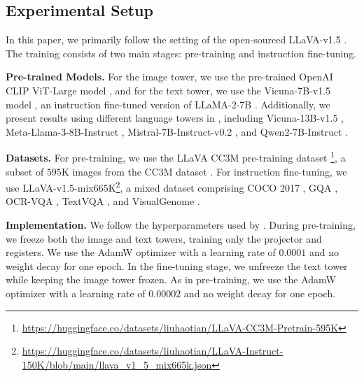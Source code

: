 \documentclass{article} %
\begin{document}
\subsection{Experimental Setup}
\label{subsec:setup}
In this paper, we primarily follow the setting of the open-sourced LLaVA-v1.5 \citep{liu2024improved}. The training consists of two main stages: pre-training and instruction fine-tuning.

\textbf{Pre-trained Models.} For the image tower, we use the pre-trained OpenAI CLIP ViT-Large model \citep{radford2021learning}, and for the text tower, we use the Vicuna-7B-v1.5 model \citep{zheng2024judging}, an instruction fine-tuned version of LLaMA-2-7B \citep{touvron2023llama}. Additionally, we present results using different language towers in , including Vicuna-13B-v1.5 \citep{zheng2024judging}, Meta-Llama-3-8B-Instruct \citep{dubey2024llama}, Mistral-7B-Instruct-v0.2 \citep{jiang2023mistral}, and Qwen2-7B-Instruct \citep{yang2024qwen2}.

\textbf{Datasets.} For pre-training, we use the LLaVA CC3M pre-training dataset \citep{liu2024visual}\footnote{\url{https://huggingface.co/datasets/liuhaotian/LLaVA-CC3M-Pretrain-595K}}, a subset of $595$K images from the CC3M dataset \citep{sharma2018conceptual}. For instruction fine-tuning, we use LLaVA-v1.5-mix$665$K\footnote{\url{https://huggingface.co/datasets/liuhaotian/LLaVA-Instruct-150K/blob/main/llava_v1_5_mix665k.json}}, a mixed dataset comprising COCO 2017 \citep{lin2014microsoft}, GQA \citep{hudson2019gqa}, OCR-VQA \citep{mishraICDAR19}, TextVQA \citep{singh2019towards}, and VisualGenome \citep{krishna2017visual}.

\textbf{Implementation.} 
We follow the hyperparameters used by \citet{liu2024visual}. During pre-training, we freeze both the image and text towers, training only the projector and registers. We use the AdamW optimizer \citep{loshchilov2017decoupled} with a learning rate of $0.0001$ and no weight decay for one epoch. In the fine-tuning stage, we unfreeze the text tower while keeping the image tower frozen. As in pre-training, we use the AdamW optimizer with a learning rate of $0.00002$ and no weight decay for one epoch.

\vspace{-0.1cm}
\end{document}

